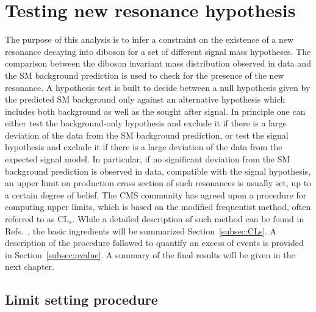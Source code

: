 \section{Testing new resonance hypothesis}\label{sec:stat}

The purpose of this analysis is to infer a constraint on the existence of a new resonance decaying into diboson for a set of different signal mass hypotheses.
The comparison between the diboson invariant mass distribution observed in data and the SM background prediction is used to check for the presence of the new resonance.
A hypothesis test is built to decide between a null hypothesis given by the predicted SM background only against an alternative hypothesis which includes both background as well as the sought after signal.
In principle one can either test the background-only hypothesis and exclude it if there is a large deviation of the data from the SM background prediction,
or test the signal hypothesis and exclude it if there is a large deviation of the data from the expected signal model.
In particular, if no significant deviation from the SM background prediction is observed in data, compatible with the signal hypothesis, an upper limit on 
production cross section of such resonances is usually set, up to a certain degree of belief.
The CMS community has agreed upon a procedure for computing upper limits, which is based on the modified frequentist method, often referred to as $\mathrm{CL}_s$.
While a detailed description of such method can be found in Refs.~\cite{CLs1,Junk:1999kv}, the basic ingredients will be summarized Section~\ref{subsec:CLs}.
A description of the procedure followed to quantify an excess of events is provided in Section~\ref{subsec:pvalue}. A summary of the final results will be given in the next chapter.

\subsection{Limit setting procedure}~\label{subsec:CLs}

